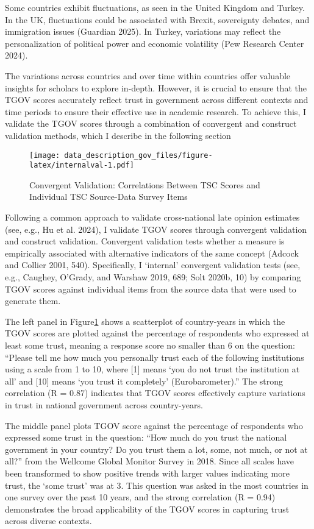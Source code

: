 \documentclass[
  12pt,
]{article}
\begin{document}
Some countries exhibit fluctuations, as seen in the United Kingdom and Turkey.
In the UK, fluctuations could be associated with Brexit, sovereignty debates, and immigration issues (Guardian 2025).
In Turkey, variations may reflect the personalization of political power and economic volatility (Pew Research Center 2024).

The variations across countries and over time within countries offer valuable insights for scholars to explore in-depth.
However, it is crucial to ensure that the TGOV scores accurately reflect trust in government across different contexts and time periods to ensure their effective use in academic research.
To achieve this, I validate the TGOV scores through a combination of convergent and construct validation methods, which I describe in the following section

\begin{figure}
\centering
\texttt{[image: data\_description\_gov\_files/figure-latex/internalval-1.pdf]}
\caption{\label{fig:internalval}Convergent Validation: Correlations Between TSC Scores and Individual TSC Source-Data Survey Items \label{internal_val}}
\end{figure}

Following a common approach to validate cross-national late opinion estimates (see, e.g., Hu et al. 2024), I validate TGOV scores through convergent validation and construct validation.
Convergent validation tests whether a measure is empirically associated with alternative indicators of the same concept (Adcock and Collier 2001, 540).
Specifically, I `internal' convergent validation tests (see, e.g., Caughey, O'Grady, and Warshaw 2019, 689; Solt 2020b, 10) by comparing TGOV scores against individual items from the source data that were used to generate them.

The left panel in Figure\nobreakspace{}\ref{internal_val} shows a scatterplot of country-years in which the TGOV scores are plotted against the percentage of respondents who expressed at least some trust, meaning a response score no smaller than 6 on the question: ``Please tell me how much you personally trust each of the following institutions using a scale from 1 to 10, where {[}1{]} means `you do not trust the institution at all' and {[}10{]} means `you trust it completely' (Eurobarometer).''
The strong correlation (R = 0.87) indicates that TGOV scores effectively capture variations in trust in national government across country-years.

The middle panel plots TGOV score against the percentage of respondents who expressed some trust in the question: ``How much do you trust the national government in your country? Do you trust them a lot, some, not much, or not at all?'' from the Wellcome Global Monitor Survey in 2018.
Since all scales have been transformed to show positive trends with larger values indicating more trust, the `some trust' was at 3.
This question was asked in the most countries in one survey over the past 10 years, and the strong correlation (R = 0.94) demonstrates the broad applicability of the TGOV scores in capturing trust across diverse contexts.
\end{document}
